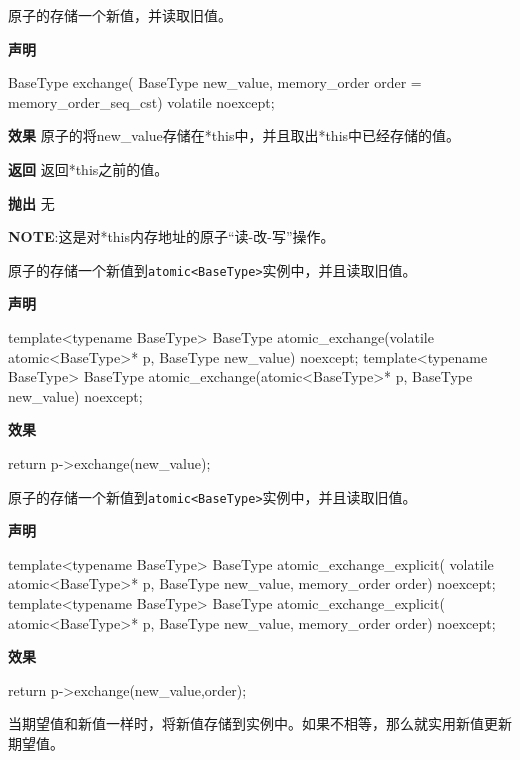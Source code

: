 原子的存储一个新值，并读取旧值。

\textbf{声明}

\begin{cpp}
BaseType exchange(
    BaseType new_value,
    memory_order order = memory_order_seq_cst)
    volatile noexcept;
\end{cpp}

\textbf{效果}
原子的将new\_value存储在*this中，并且取出*this中已经存储的值。

\textbf{返回}
返回*this之前的值。

\textbf{抛出}
无

\textbf{NOTE}:这是对*this内存地址的原子“读-改-写”操作。


原子的存储一个新值到\texttt{atomic<BaseType>}实例中，并且读取旧值。

\textbf{声明}

\begin{cpp}
template<typename BaseType>
BaseType atomic_exchange(volatile atomic<BaseType>* p, BaseType new_value)
    noexcept;
template<typename BaseType>
BaseType atomic_exchange(atomic<BaseType>* p, BaseType new_value) noexcept;
\end{cpp}

\textbf{效果}

\begin{cpp}
return p->exchange(new_value);
\end{cpp}


原子的存储一个新值到\texttt{atomic<BaseType>}实例中，并且读取旧值。

\textbf{声明}

\begin{cpp}
template<typename BaseType>
BaseType atomic_exchange_explicit(
    volatile atomic<BaseType>* p, BaseType new_value, memory_order order)
    noexcept;
template<typename BaseType>
BaseType atomic_exchange_explicit(
    atomic<BaseType>* p, BaseType new_value, memory_order order) noexcept;
\end{cpp}

\textbf{效果}

\begin{cpp}
return p->exchange(new_value,order);
\end{cpp}


当期望值和新值一样时，将新值存储到实例中。如果不相等，那么就实用新值更新期望值。

